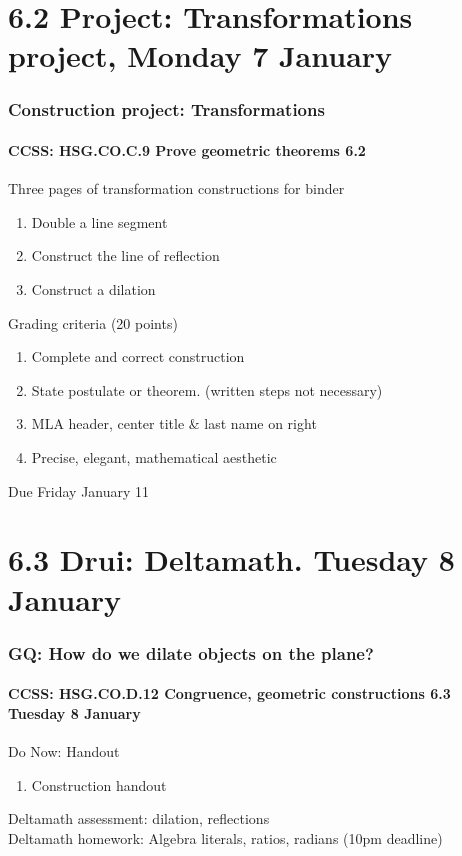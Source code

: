 \documentclass{beamer}
\begin{document}
\section{6.2 Project: Transformations project, Monday 7 January}
  \frame
  {
    \frametitle{Construction project: Transformations}
    \framesubtitle{CCSS: HSG.CO.C.9 Prove geometric theorems  \alert{6.2}}

    \begin{block}{Three pages of transformation constructions for binder}
    \begin{enumerate}
      \item Double a line segment
      \item Construct the line of reflection
      \item Construct a dilation
    \end{enumerate}
      Grading criteria (20 points)
    \begin{enumerate}
      \item Complete and correct construction
      \item State postulate or theorem. (written steps not necessary)
      \item MLA header, center title \& last name on right
      \item Precise, elegant, mathematical aesthetic
    \end{enumerate}
    \end{block}
    Due Friday January 11
    }

\section{6.3 Drui: Deltamath. Tuesday 8 January}
  \frame
  {
    \frametitle{GQ: How do we dilate objects on the plane?}
    \framesubtitle{CCSS: HSG.CO.D.12 Congruence, geometric constructions  \alert{6.3 Tuesday 8 January}}

    \begin{block}{Do Now: Handout}
      \begin{enumerate}
        \item Construction handout
      \end{enumerate}
    \end{block}
    Deltamath assessment: dilation, reflections\\
    Deltamath homework: Algebra literals, ratios, radians (10pm deadline)
  }
\end{document}
